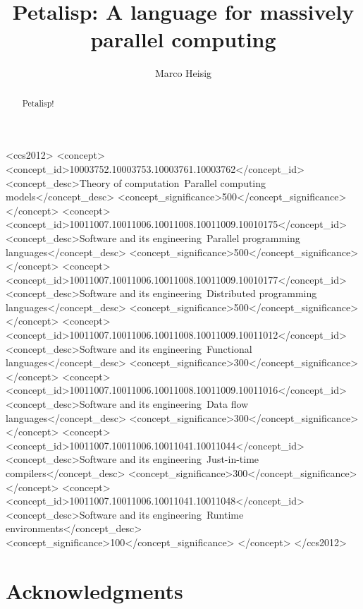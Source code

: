 \documentclass[sigconf]{acmart}
\theoremstyle{definition}
\begin{document}
\title{Petalisp: A language for massively parallel computing}

\author{Marco Heisig}

\begin{abstract}
  Petalisp!
\end{abstract}

\begin{CCSXML}
<ccs2012>
<concept>
<concept_id>10003752.10003753.10003761.10003762</concept_id>
<concept_desc>Theory of computation~Parallel computing models</concept_desc>
<concept_significance>500</concept_significance>
</concept>
<concept>
<concept_id>10011007.10011006.10011008.10011009.10010175</concept_id>
<concept_desc>Software and its engineering~Parallel programming languages</concept_desc>
<concept_significance>500</concept_significance>
</concept>
<concept>
<concept_id>10011007.10011006.10011008.10011009.10010177</concept_id>
<concept_desc>Software and its engineering~Distributed programming languages</concept_desc>
<concept_significance>500</concept_significance>
</concept>
<concept>
<concept_id>10011007.10011006.10011008.10011009.10011012</concept_id>
<concept_desc>Software and its engineering~Functional languages</concept_desc>
<concept_significance>300</concept_significance>
</concept>
<concept>
<concept_id>10011007.10011006.10011008.10011009.10011016</concept_id>
<concept_desc>Software and its engineering~Data flow languages</concept_desc>
<concept_significance>300</concept_significance>
</concept>
<concept>
<concept_id>10011007.10011006.10011041.10011044</concept_id>
<concept_desc>Software and its engineering~Just-in-time compilers</concept_desc>
<concept_significance>300</concept_significance>
</concept>
<concept>
<concept_id>10011007.10011006.10011041.10011048</concept_id>
<concept_desc>Software and its engineering~Runtime environments</concept_desc>
<concept_significance>100</concept_significance>
</concept>
</ccs2012>
\end{CCSXML}



\maketitle



%
%
%

\section{Acknowledgments}



\end{document}
